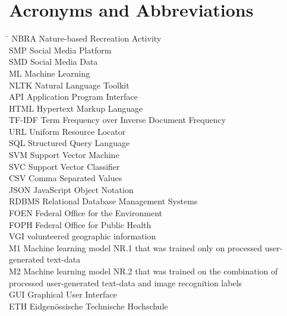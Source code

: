 
\section*{Acronyms and Abbreviations}
\begin{tabbing}
 \hspace*{1.6cm}  \= \kill
 NBRA \> Nature-based Recreation Activity \\[0.5ex]
 SMP \> Social Media Platform \\
 SMD \> Social Media Data \\
 ML \> Machine Learning \\
 NLTK \> Natural Language Toolkit \\
 API \> Application Program Interface \\
 HTML \> Hypertext Markup Language \\
 TF-IDF \> Term Frequency over Inverse Document Frequency \\
 URL \> Uniform Resource Locator \\
 SQL \> Structured Query Language \\
 SVM \> Support Vector Machine \\
 SVC \> Support Vector Classifier \\
 CSV \> Comma Separated Values \\
 JSON \> JavaScript Object Notation \\
 RDBMS \> Relational Database Management Systems \\
 FOEN \> Federal Office for the Environment \\
 FOPH \> Federal Office for Public Health \\
 VGI \> volunteered geographic information \\
 M1 \> Machine learning model NR.1 that was trained only on processed user-generated text-data \\
 M2 \> Machine learning model NR.2 that was trained on the combination of processed user-generated text-data and image recognition labels \\
 GUI \> Graphical User Interface \\
 ETH \> Eidgen\"{o}ssische Technische Hochschule
\end{tabbing}

